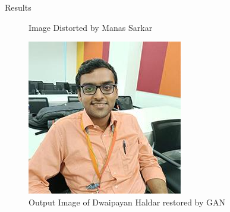 \documentclass{beamer}
\begin{document}
\begin{frame}{Results}
\begin{figure}[h]
\begin{minipage}{0.32\textwidth}
        \caption{Image Distorted by Manas Sarkar}
    \end{minipage}
    \hfill
    \begin{minipage}{0.32\textwidth}
        \centering
        \includegraphics[width=\linewidth]{out_image.jpg} %
        \caption{Output Image of Dwaipayan Haldar restored by GAN}
    \end{minipage}
\end{figure}
    
\end{frame}
\end{document}
